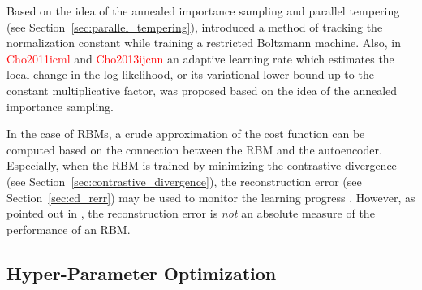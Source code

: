 \documentclass{now}
\newcommand{\alert}[1]{\textcolor{red}{#1}}
\newcommand{\citepub}[1]{\alert{#1}}
\begin{document}
Based on the idea of the annealed importance sampling and
parallel tempering (see
Section~\ref{sec:parallel_tempering}),
\citet{Desjardins2011} introduced a method of tracking the
normalization constant while training a restricted Boltzmann
machine. Also, in \citepub{Cho2011icml} and
\citepub{Cho2013ijcnn} an adaptive learning rate which
estimates the local change in the log-likelihood, or its
variational lower bound up to the constant multiplicative
factor, was
proposed based on the idea of the annealed importance
sampling.

In the case of RBMs, a crude approximation of the cost
function can be computed based on the connection between the
RBM and the autoencoder. Especially, when the RBM is trained
by minimizing the contrastive divergence (see
Section~\ref{sec:contrastive_divergence}), the
reconstruction error (see Section~\ref{sec:cd_rerr}) may be
used to monitor the learning progress \citep{Hinton2012rbm}.
However, as pointed out in \citep{Hinton2012rbm}, the
reconstruction error is \textit{not} an absolute measure of
the performance of an RBM.

\subsection{Hyper-Parameter Optimization}
\label{sec:hyperopt}
\end{document}
